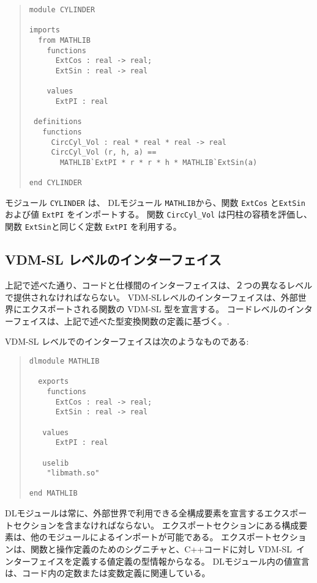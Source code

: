 \documentclass[\pformat,12pt]{jarticle}
\newcommand{\vdmslpp}{VDM-SL}
\begin{document}
\begin{quote}
\begin{verbatim}
module CYLINDER

imports
  from MATHLIB
    functions
      ExtCos : real -> real;
      ExtSin : real -> real
   
    values
      ExtPI : real

 definitions
   functions
     CircCyl_Vol : real * real * real -> real
     CircCyl_Vol (r, h, a) ==
       MATHLIB`ExtPI * r * r * h * MATHLIB`ExtSin(a)

end CYLINDER      
\end{verbatim}
\end{quote}

モジュール {\tt CYLINDER} は、 DLモジュール {\tt MATHLIB}から、関数 {\tt ExtCos} と{\tt ExtSin} および値 {\tt ExtPI} をインポートする。
関数 {\tt CircCyl\_Vol} は円柱の容積を評価し、関数 {\tt ExtSin}と同じく定数 {\tt ExtPI} を利用する。
 
\subsection*{VDM-SL レベルのインターフェイス}

上記で述べた通り、コードと仕様間のインターフェイスは、２つの異なるレベルで提供されなければならない。
 VDM-SLレベルのインターフェイスは、外部世界にエクスポートされる関数の VDM-SL 型を宣言する。
コードレベルのインターフェイスは、上記で述べた型変換関数の定義に基づく。.

VDM-SL レベルでのインターフェイスは次のようなものである:

\begin{quote}
\begin{verbatim}
dlmodule MATHLIB

  exports
    functions
      ExtCos : real -> real;
      ExtSin : real -> real   
      
   values   
      ExtPI : real
      
   uselib
    "libmath.so"

end MATHLIB
\end{verbatim}
\end{quote}

DLモジュールは常に、外部世界で利用できる全構成要素を宣言するエクスポートセクションを含まなければならない。 
エクスポートセクションにある構成要素は、他のモジュールによるインポートが可能である。
エクスポートセクションは、関数と操作定義のためのシグニチャと、C++コードに対し \vdmslpp\ インターフェイスを定義する値定義の型情報からなる。
DLモジュール内の値宣言は、コード内の定数または変数定義に関連している。
\end{document}
